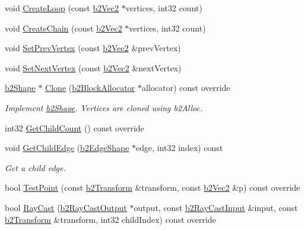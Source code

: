 \begin{DoxyCompactItemize}
void \hyperlink{classb2ChainShape_ac257742a52cac391e25962a4c703fb06}{Create\+Loop} (const \hyperlink{structb2Vec2}{b2\+Vec2} $\ast$vertices, int32 count)
\item 
void \hyperlink{classb2ChainShape_aa0977339b743c05f2179939ccc38e7e0}{Create\+Chain} (const \hyperlink{structb2Vec2}{b2\+Vec2} $\ast$vertices, int32 count)
\item 
void \hyperlink{classb2ChainShape_aeb2ddbe0c52a98885e91b7c8f597315b}{Set\+Prev\+Vertex} (const \hyperlink{structb2Vec2}{b2\+Vec2} \&prev\+Vertex)
\item 
void \hyperlink{classb2ChainShape_a15c7c2821a52266ef57621ac7d34a95f}{Set\+Next\+Vertex} (const \hyperlink{structb2Vec2}{b2\+Vec2} \&next\+Vertex)
\item 
\mbox{\label{classb2ChainShape_a5916e4b5dd8edce3cf71ecfe775501e1}} 
\hyperlink{classb2Shape}{b2\+Shape} $\ast$ \hyperlink{classb2ChainShape_a5916e4b5dd8edce3cf71ecfe775501e1}{Clone} (\hyperlink{classb2BlockAllocator}{b2\+Block\+Allocator} $\ast$allocator) const override
\begin{DoxyCompactList}\small\item\em Implement \hyperlink{classb2Shape}{b2\+Shape}. Vertices are cloned using b2\+Alloc. \end{DoxyCompactList}\item 
int32 \hyperlink{classb2ChainShape_a4d4fd8f5386a30f35b10d1b2848dbe54}{Get\+Child\+Count} () const override
\item 
\mbox{\label{classb2ChainShape_abfe7f836d3c32dc06b920df61a74f412}} 
void \hyperlink{classb2ChainShape_abfe7f836d3c32dc06b920df61a74f412}{Get\+Child\+Edge} (\hyperlink{classb2EdgeShape}{b2\+Edge\+Shape} $\ast$edge, int32 index) const
\begin{DoxyCompactList}\small\item\em Get a child edge. \end{DoxyCompactList}\item 
bool \hyperlink{classb2ChainShape_afd03c8679f18f9962a6c76bde629c62a}{Test\+Point} (const \hyperlink{structb2Transform}{b2\+Transform} \&transform, const \hyperlink{structb2Vec2}{b2\+Vec2} \&p) const override
\item 
\mbox{\label{classb2ChainShape_add9e88f7f90b32ae75738cfb042ef532}} 
bool \hyperlink{classb2ChainShape_add9e88f7f90b32ae75738cfb042ef532}{Ray\+Cast} (\hyperlink{structb2RayCastOutput}{b2\+Ray\+Cast\+Output} $\ast$output, const \hyperlink{structb2RayCastInput}{b2\+Ray\+Cast\+Input} \&input, const \hyperlink{structb2Transform}{b2\+Transform} \&transform, int32 child\+Index) const override

\end{DoxyCompactItemize}
